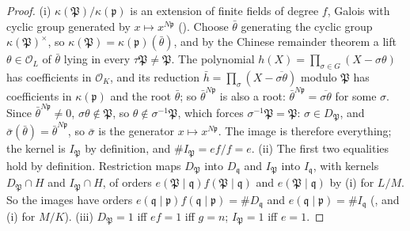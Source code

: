 \begin{proof}
(i) $\kappa(\mathfrak P)/\kappa(\mathfrak p)$ is an extension of finite fields of degree $f$, Galois with cyclic group generated by $x\mapsto x^{N\mathfrak p}$
(). Choose $\bar\theta$ generating the cyclic group $\kappa(\mathfrak P)^\times$, so $\kappa(\mathfrak P)=\kappa(\mathfrak p)(\bar\theta)$, and by
the Chinese remainder theorem a lift $\theta\in\mathcal O_L$ of $\bar\theta$ lying in every $\tau\mathfrak P\ne\mathfrak P$. The polynomial
$h(X)=\prod_{\sigma\in G}(X-\sigma\theta)$ has coefficients in $\mathcal O_K$, and its reduction $\bar h=\prod_\sigma(X-\overline{\sigma\theta})$ modulo $\mathfrak P$ has
coefficients in $\kappa(\mathfrak p)$ and the root $\bar\theta$; so $\bar\theta^{N\mathfrak p}$ is also a root: $\bar\theta^{N\mathfrak p}=\overline{\sigma\theta}$
for some $\sigma$. Since $\bar\theta^{N\mathfrak p}\ne0$, $\sigma\theta\notin\mathfrak P$, so $\theta\notin\sigma^{-1}\mathfrak P$, which forces
$\sigma^{-1}\mathfrak P=\mathfrak P$: $\sigma\in D_{\mathfrak P}$, and $\bar\sigma(\bar\theta)=\bar\theta^{N\mathfrak p}$, so $\bar\sigma$ is the generator
$x\mapsto x^{N\mathfrak p}$. The image is therefore everything; the kernel is $I_{\mathfrak P}$ by definition, and $\#I_{\mathfrak P}=ef/f=e$.
(ii) The first two equalities hold by definition. Restriction maps $D_{\mathfrak P}$ into $D_{\mathfrak q}$ and $I_{\mathfrak P}$ into $I_{\mathfrak q}$, with
kernels $D_{\mathfrak P}\cap H$ and $I_{\mathfrak P}\cap H$, of orders $e(\mathfrak P\mid\mathfrak q)f(\mathfrak P\mid\mathfrak q)$ and $e(\mathfrak P\mid\mathfrak q)$ by (i) for
$L/M$. So the images have orders $e(\mathfrak q\mid\mathfrak p)f(\mathfrak q\mid\mathfrak p)=\#D_{\mathfrak q}$ and $e(\mathfrak q\mid\mathfrak p)=\#I_{\mathfrak q}$
(, and (i) for $M/K$). (iii) $D_{\mathfrak P}=1$ iff $ef=1$ iff $g=n$; $I_{\mathfrak P}=1$ iff $e=1$.
\end{proof}

